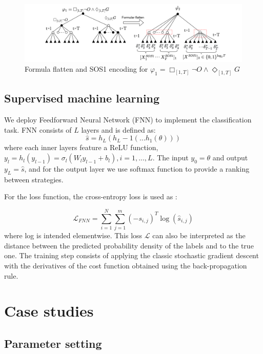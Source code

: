 \documentclass[a4paper]{report}
\begin{document}
\begin{figure}[htbp] \centering 
    \vspace{0.5cm}
    \centering
    \includegraphics[scale=0.55]{alawasy_eventually.png}
    \vspace{-0.4cm}
    \caption{Formula flatten and SOS1 encoding for $\varphi_1=\Box_{[1,T]}\lnot O\wedge \Diamond_{[1,T]}G$ }
    \label{always_eventually}
    \vspace{-0.6cm}
\end{figure} 

\section{Supervised machine learning}
We deploy Feedforward Neural Network (FNN) to implement the classification task. FNN consists of $L$ layers and is defined as:
\begin{equation}
    \hat{s} = h_L(h_L-1(...h_1(\theta)))
\end{equation}
where each inner layers feature a ReLU function, $y_l=h_l(y_{l-1})=\sigma_l(W_ly_{l-1}+b_l), i=1,...,L$. The input $y_0=\theta$ and output $y_L = \hat{s}$, and for the output layer we use softmax function to provide a ranking between strategies.

For the loss function, the cross-entropy loss is used as :

\begin{equation}
    \mathcal{L}_{FNN}= \sum_{i=1}^{N}\sum_{j=1}^{m}(-s_{i,j})^T\log(\hat{s}_{i,j}) 
\end{equation}
where log is intended elementwise. This loss $\mathcal{L}$ can also be interpreted as the distance between the predicted probability density of the labels and to the true one. The training step consists of applying the classic stochastic
gradient descent with the derivatives of the cost function obtained using the back-propagation rule.


\chapter{Case studies}
\section{Parameter setting}
\end{document}
